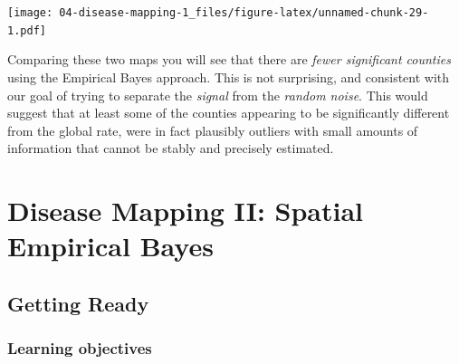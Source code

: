 \documentclass[
]{book}
\begin{document}
\texttt{[image: 04-disease-mapping-1\_files/figure-latex/unnamed-chunk-29-1.pdf]}

Comparing these two maps you will see that there are \emph{fewer significant counties} using the Empirical Bayes approach. This is not surprising, and consistent with our goal of trying to separate the \emph{signal} from the \emph{random noise}. This would suggest that at least some of the counties appearing to be significantly different from the global rate, were in fact plausibly outliers with small amounts of information that cannot be stably and precisely estimated.

\hypertarget{disease-mapping-ii-spatial-empirical-bayes}{%
\chapter{Disease Mapping II: Spatial Empirical Bayes}\label{disease-mapping-ii-spatial-empirical-bayes}}

\hypertarget{getting-ready-3}{%
\section{Getting Ready}\label{getting-ready-3}}

\hypertarget{learning-objectives-4}{%
\subsection{Learning objectives}\label{learning-objectives-4}}

 
  \providecommand{\huxb}[2]{\arrayrulecolor[RGB]{#1}\global\arrayrulewidth=#2pt}
  \providecommand{\huxvb}[2]{\color[RGB]{#1}\vrule width #2pt}
  \providecommand{\huxtpad}[1]{\rule{0pt}{#1}}
  \providecommand{\huxbpad}[1]{\rule[-#1]{0pt}{#1}}
\end{document}
